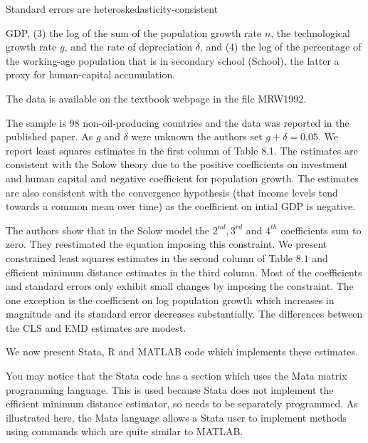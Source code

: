 \documentclass[10pt]{article}
\begin{document}
Standard errors are heteroskedasticity-consistent

GDP, (3) the log of the sum of the population growth rate $n$, the technological growth rate $g$, and the rate of depreciation $\delta$, and (4) the log of the percentage of the working-age population that is in secondary school (School), the latter a proxy for human-capital accumulation.

The data is available on the textbook webpage in the file MRW1992.

The sample is 98 non-oil-producing countries and the data was reported in the published paper. As $g$ and $\delta$ were unknown the authors set $g+\delta=0.05$. We report least squares estimates in the first column of Table 8.1. The estimates are consistent with the Solow theory due to the positive coefficients on investment and human capital and negative coefficient for population growth. The estimates are also consistent with the convergence hypothesis (that income levels tend towards a common mean over time) as the coefficient on intial GDP is negative.

The authors show that in the Solow model the $2^{n d}, 3^{r d}$ and $4^{t h}$ coefficients sum to zero. They reestimated the equation imposing this constraint. We present constrained least squares estimates in the second column of Table $8.1$ and efficient minimum distance estimates in the third column. Most of the coefficients and standard errors only exhibit small changes by imposing the constraint. The one exception is the coefficient on log population growth which increases in magnitude and its standard error decreases substantially. The differences between the CLS and EMD estimates are modest.

We now present Stata, R and MATLAB code which implements these estimates.

You may notice that the Stata code has a section which uses the Mata matrix programming language. This is used because Stata does not implement the efficient minimum distance estimator, so needs to be separately programmed. As illustrated here, the Mata language allows a Stata user to implement methods using commands which are quite similar to MATLAB.
\end{document}
